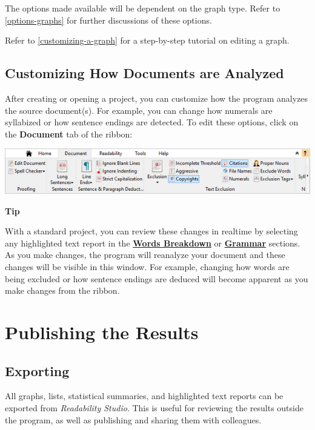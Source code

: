 \documentclass[
]{book}
\newenvironment{tipsection}
    {
    \begin{tcolorbox}[colframe=lightgray,colback=lightyellow,arc=3mm]
    \faLightbulb[regular] \textbf{Tip} \newline
    }
    {
    \end{tcolorbox}
    }
\theoremstyle{definition}
\theoremstyle{definition}
\theoremstyle{definition}
\theoremstyle{definition}
\theoremstyle{remark}
\begin{document}
The options made available will be dependent on the graph type. Refer to \ref{options-graphs} for further discussions of these options.

Refer to \ref{customizing-a-graph} for a step-by-step tutorial on editing a graph.

\hypertarget{customizing-how-documents-are-analyzed}{%
\section{Customizing How Documents are Analyzed}\label{customizing-how-documents-are-analyzed}}

After creating or opening a project, you can customize how the program analyzes the source document(s). For example, you can change how numerals are syllabized or how sentence endings are detected. To edit these options, click on the \textbf{Document} tab of the ribbon:

\includegraphics{Images/RibbonEditDocumentOptions.png}

\begin{tipsection}
With a standard project, you can review these changes in realtime by selecting any highlighted text report in the \protect\hyperlink{reviewing-word-breakdowns}{\textbf{Words Breakdown}} or \protect\hyperlink{reviewing-standard-grammar}{\textbf{Grammar}} sections. As you make changes, the program will reanalyze your document and these changes will be visible in this window. For example, changing how words are being excluded or how sentence endings are deduced will become apparent as you make changes from the ribbon.

\end{tipsection}

\hypertarget{publishing-the-results}{%
\chapter{Publishing the Results}\label{publishing-the-results}}

\hypertarget{exporting}{%
\section{Exporting}\label{exporting}}

All graphs, lists, statistical summaries, and highlighted text reports can be exported from \emph{Readability Studio}. This is useful for reviewing the results outside the program, as well as publishing and sharing them with colleagues.
\end{document}
